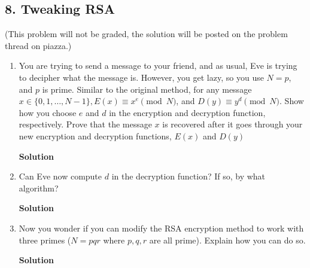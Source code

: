 \documentclass{article}\usepackage{amsmath,amssymb,amsthm,tikz,tkz-graph,color,chngpage,soul,hyperref,csquotes,graphicx,floatrow}\newcommand*{\QEDB}{\hfill\ensuremath{\square}}\newtheorem*{prop}{Proposition}\renewcommand{\theenumi}{\alph{enumi}}\usepackage[shortlabels]{enumitem}\usepackage[nobreak=true]{mdframed}\usetikzlibrary{matrix,calc}\MakeOuterQuote{"}\usepackage[margin=0.75in]{geometry}
\begin{document}

\subsection*{8. Tweaking RSA}
(This problem will not be graded, the solution will be posted on the problem thread on piazza.)
\begin{enumerate}
\item You are trying to send a message to your friend, and as usual, Eve is trying to decipher what the message is. However, you get lazy, so you use $N=p$, and $p$ is prime. Similar to the original method, for any message $x\in \{0,1,\ldots,N-1\}, E(x)\equiv x^e\pmod N$, and $D(y)\equiv y^d\pmod N$. Show how you choose $e$ and $d$ in the encryption and decryption function, respectively. Prove that the message $x$ is recovered after it goes through your new encryption and decryption functions, $E(x)$ and $D(y)$
\begin{mdframed}
\textbf{Solution}

\end{mdframed}
\item Can Eve now compute $d$ in the decryption function? If so, by what algorithm?
\begin{mdframed}
\textbf{Solution}

\end{mdframed}
\item Now you wonder if you can modify the RSA encryption method to work with three primes ($N=pqr$ where $p,q,r$ are all prime). Explain how you can do so.
\begin{mdframed}
\textbf{Solution}

\end{mdframed}
\end{enumerate}
\clearpage
\end{document}
